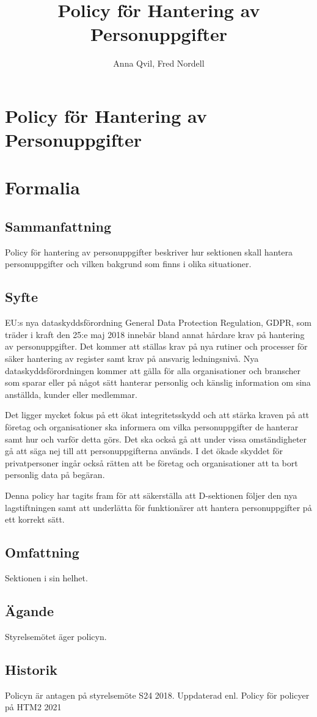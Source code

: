 \documentclass{dsekprotokoll}
\title{Policy för Hantering av Personuppgifter}
\author{Anna Qvil, Fred Nordell}
\begin{document}
\section*{Policy för Hantering av Personuppgifter}
\section{Formalia}
\subsection{Sammanfattning}
Policy för hantering av personuppgifter beskriver hur sektionen skall hantera personuppgifter och vilken bakgrund som finns i olika situationer.
\subsection{Syfte}
EU:s nya dataskyddsförordning General Data Protection Regulation, GDPR, som träder i kraft den 25:e maj 2018 innebär bland annat hårdare krav på hantering av personuppgifter. Det kommer att ställas krav på nya rutiner och processer för säker hantering av register samt krav på ansvarig ledningsnivå. Nya dataskyddsförordningen kommer att gälla för alla organisationer och branscher som sparar eller på något sätt hanterar personlig och känslig information om sina anställda, kunder eller medlemmar.

\par Det ligger mycket fokus på ett ökat integritetsskydd och att stärka kraven på att företag och organisationer ska informera om vilka personuppgifter de hanterar samt hur och varför detta görs. Det ska också gå att under vissa omständigheter gå att säga nej till att personuppgifterna används. I det ökade skyddet för privatpersoner ingår också rätten att be företag och organisationer att ta bort personlig data på begäran.

Denna policy har tagits fram för att säkerställa att D-sektionen följer den nya lagstiftningen samt att underlätta för funktionärer att hantera personuppgifter på ett korrekt sätt.
\subsection{Omfattning}
Sektionen i sin helhet.
\subsection{Ägande}
Styrelsemötet äger policyn.
\subsection{Historik}
Policyn är antagen på styrelsemöte S24 2018.
Uppdaterad enl. Policy för policyer på HTM2 2021
\end{document}
